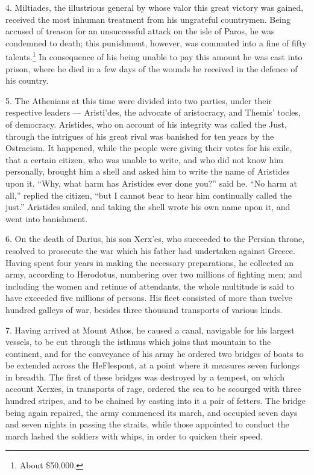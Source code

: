 \documentclass[openany,a4paper]{memoir}
\begin{document}
4. Miltiades, the illustrious general by whose valor this 
great victory was gained, received the most inhuman treatment from his ungrateful countrymen. Being accused of 
treason for an unsuccessful attack on the isle of Paros, he 
was condemned to death; this punishment, however, was commuted into a fine of fifty talents.\footnote{About \$50,000.} In consequence of his 
being unable to pay this amount he was cast into prison, 
where he died in a few days of the wounds he received in the 
defence of his country. 

5. The Athenians at this time were divided into two parties, under their respective leaders — Aristi'des, the advocate 
of aristocracy, and Themis' tocles, of democracy. Aristides, 
who on account of his integrity was called the Just, through 
the intrigues of his great rival was banished for ten years 
by the Ostracism. It happened, while the people were giving 
their votes for his exile, that a certain citizen, who was unable to write, and who did not know him personally, brought 
him a shell and asked him to write the name of Aristides 
upon it. ``Why, what harm has Aristides ever done you?''
said he. ``No harm at all,'' replied the citizen, ``but I cannot bear to hear him continually called the just.'' Aristides 
smiled, and taking the shell wrote his own name upon it, 
and went into banishment. 

6. On the death of Darius, his son Xerx'es, who succeeded 
to the Persian throne, resolved to prosecute the war which 
his father had undertaken against Greece. Having spent four 
years in making the necessary preparations, he collected an 
army, according to Herodotus, numbering over two millions 
of fighting men; and including the women and retinue of attendants, the whole multitude is said to have exceeded five 
millions of persons. His fleet consisted of more than twelve 
hundred galleys of war, besides three thousand transports of 
various kinds. 

7. Having arrived at Mount Athos, he caused a canal, navigable for his largest vessels, to be cut through the isthmus 
which joins that mountain to the continent, and for the conveyance of his army he ordered two bridges of boats to be 
extended across the HeFlespont, at a point where it measures 
seven furlongs in breadth. The first of these bridges was 
destroyed by a tempest, on which account Xerxes, in transports of rage, ordered the sea to be scourged with three 
hundred stripes, and to be chained by casting into it a pair 
of fetters. The bridge being again repaired, the army commenced its march, and occupied seven days and seven nights 
in passing the straits, while those appointed to conduct the 
march lashed the soldiers with whips, in order to quicken 
their speed. 
\end{document}
